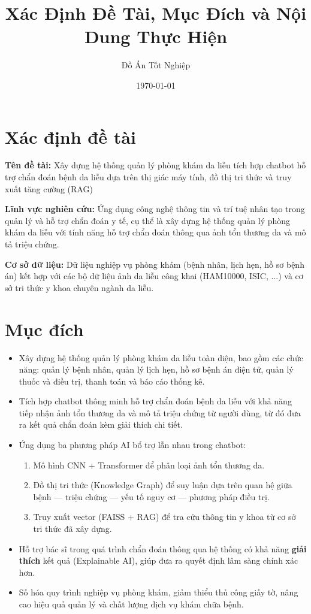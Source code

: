 \documentclass[12pt,a4paper]{article}
\title{Xác Định Đề Tài, Mục Đích và Nội Dung Thực Hiện}
\author{Đồ Án Tốt Nghiệp}
\date{\today}
\begin{document}
\maketitle

\section{Xác định đề tài}

\textbf{Tên đề tài:} Xây dựng hệ thống quản lý phòng khám da liễu tích hợp chatbot hỗ trợ chẩn đoán bệnh da liễu dựa trên thị giác máy tính, đồ thị tri thức và truy xuất tăng cường (RAG)

\textbf{Lĩnh vực nghiên cứu:} Ứng dụng công nghệ thông tin và trí tuệ nhân tạo trong quản lý và hỗ trợ chẩn đoán y tế, cụ thể là xây dựng hệ thống quản lý phòng khám da liễu với tính năng hỗ trợ chẩn đoán thông qua ảnh tổn thương da và mô tả triệu chứng.

\textbf{Cơ sở dữ liệu:} Dữ liệu nghiệp vụ phòng khám (bệnh nhân, lịch hẹn, hồ sơ bệnh án) kết hợp với các bộ dữ liệu ảnh da liễu công khai (HAM10000, ISIC, ...) và cơ sở tri thức y khoa chuyên ngành da liễu.

\section{Mục đích}

\begin{itemize}
    \item Xây dựng hệ thống quản lý phòng khám da liễu toàn diện, bao gồm các chức năng: quản lý bệnh nhân, quản lý lịch hẹn, hồ sơ bệnh án điện tử, quản lý thuốc và điều trị, thanh toán và báo cáo thống kê.
    \item Tích hợp chatbot thông minh hỗ trợ chẩn đoán bệnh da liễu với khả năng tiếp nhận ảnh tổn thương da và mô tả triệu chứng từ người dùng, từ đó đưa ra kết quả chẩn đoán kèm giải thích chi tiết.
    \item Ứng dụng ba phương pháp AI bổ trợ lẫn nhau trong chatbot:
    \begin{enumerate}
        \item Mô hình CNN + Transformer để phân loại ảnh tổn thương da.
        \item Đồ thị tri thức (Knowledge Graph) để suy luận dựa trên quan hệ giữa bệnh --- triệu chứng --- yếu tố nguy cơ --- phương pháp điều trị.
        \item Truy xuất vector (FAISS + RAG) để tra cứu thông tin y khoa từ cơ sở tri thức đã xây dựng.
    \end{enumerate}
    \item Hỗ trợ bác sĩ trong quá trình chẩn đoán thông qua hệ thống có khả năng \textbf{giải thích} kết quả (Explainable AI), giúp đưa ra quyết định lâm sàng chính xác hơn.
    \item Số hóa quy trình nghiệp vụ phòng khám, giảm thiểu thủ công giấy tờ, nâng cao hiệu quả quản lý và chất lượng dịch vụ khám chữa bệnh.
\end{itemize}
\end{document}
